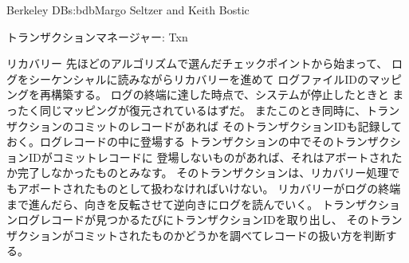 \begin{aosachapter}{Berkeley DB}{s:bdb}{Margo Seltzer and Keith Bostic}
\begin{aosasect1}{トランザクションマネージャー: Txn}
\begin{aosasect2}{リカバリー}
先ほどのアルゴリズムで選んだチェックポイントから始まって、
ログをシーケンシャルに読みながらリカバリーを進めて
ログファイルIDのマッピングを再構築する。
ログの終端に達した時点で、システムが停止したときと
まったく同じマッピングが復元されているはずだ。
またこのとき同時に、トランザクションのコミットのレコードがあれば
そのトランザクションIDも記録しておく。ログレコードの中に登場する
トランザクションの中でそのトランザクションIDがコミットレコードに
登場しないものがあれば、それはアボートされたか完了しなかったものとみなす。
そのトランザクションは、リカバリー処理でもアボートされたものとして扱わなければいけない。
リカバリーがログの終端まで進んだら、向きを反転させて逆向きにログを読んでいく。
トランザクションログレコードが見つかるたびにトランザクションIDを取り出し、
そのトランザクションがコミットされたものかどうかを調べてレコードの扱い方を判断する。

\end{aosasect2}
\end{aosasect1}
\end{aosachapter}
